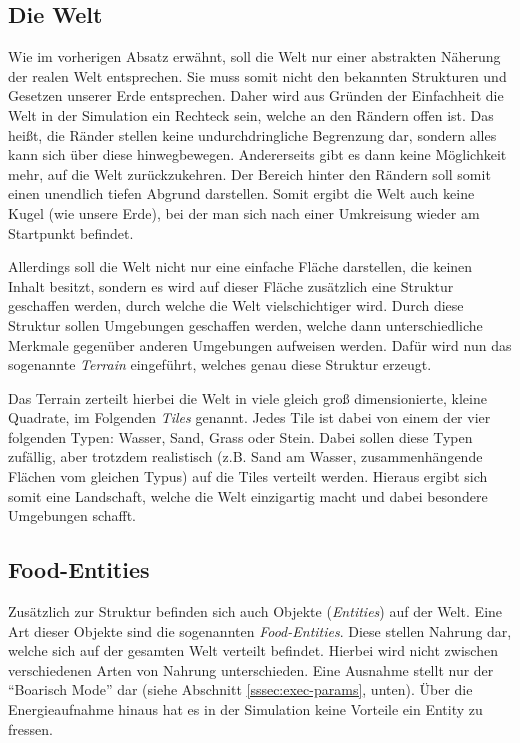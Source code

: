 \documentclass[course=erap]{aspdoc}
\begin{document}
\subsection{Die Welt}
\label{subsec:die-welt}
Wie im vorherigen Absatz erwähnt, soll die Welt nur einer abstrakten Näherung der realen Welt entsprechen. Sie muss somit nicht den bekannten Strukturen und Gesetzen unserer Erde entsprechen. Daher wird aus Gründen der Einfachheit die Welt in der Simulation ein Rechteck sein, welche an den Rändern offen ist. Das heißt, die Ränder stellen keine undurchdringliche Begrenzung dar, sondern alles kann sich über diese hinwegbewegen. Andererseits gibt es dann keine Möglichkeit mehr, auf die Welt zurückzukehren. Der Bereich hinter den Rändern soll somit einen unendlich tiefen Abgrund darstellen. Somit ergibt die Welt auch keine Kugel (wie unsere Erde), bei der man sich nach einer Umkreisung wieder am Startpunkt befindet.

Allerdings soll die Welt nicht nur eine einfache Fläche darstellen, die keinen Inhalt besitzt, sondern es wird auf dieser Fläche zusätzlich eine Struktur geschaffen werden, durch welche die Welt vielschichtiger wird. Durch diese Struktur sollen Umgebungen geschaffen werden, welche dann unterschiedliche Merkmale gegenüber anderen Umgebungen aufweisen werden. Dafür wird nun das sogenannte \emph{Terrain} eingeführt, welches genau diese Struktur erzeugt.

Das Terrain zerteilt hierbei die Welt in viele gleich groß dimensionierte, kleine Quadrate, im Folgenden \emph{Tiles} genannt. Jedes Tile ist dabei von einem der vier folgenden Typen: Wasser, Sand, Grass oder Stein. Dabei sollen diese Typen zufällig, aber trotzdem realistisch (z.B. Sand am Wasser, zusammenhängende Flächen vom gleichen Typus) auf die Tiles verteilt werden. Hieraus ergibt sich somit eine Landschaft, welche die Welt einzigartig macht und dabei besondere Umgebungen schafft.


\subsection{Food-Entities}
Zusätzlich zur Struktur befinden sich auch Objekte (\emph{Entities}) auf der Welt. Eine Art dieser Objekte sind die sogenannten \emph{Food-Entities}. Diese stellen Nahrung dar, welche sich auf der gesamten Welt verteilt befindet. Hierbei wird nicht zwischen verschiedenen Arten von Nahrung unterschieden. Eine Ausnahme stellt nur der "`Boarisch Mode"' dar (siehe Abschnitt \ref{sssec:exec-params}, unten). Über die Energieaufnahme hinaus hat es in der Simulation keine Vorteile ein Entity zu fressen.
\end{document}
